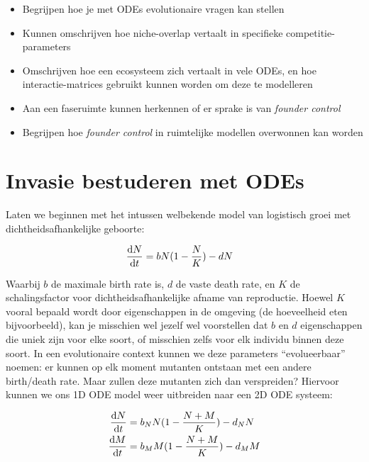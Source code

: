\documentclass[
  a4paper,
]{scrbook}
\providecommand{\tightlist}{%
  \setlength{\itemsep}{0pt}\setlength{\parskip}{0pt}}\usepackage{longtable,booktabs,array}
\theoremstyle{definition}
\theoremstyle{remark}
\begin{document}
\begin{itemize}
\tightlist
\item
  Begrijpen hoe je met ODEs evolutionaire vragen kan stellen
\item
  Kunnen omschrijven hoe niche-overlap vertaalt in specifieke
  competitie-parameters
\item
  Omschrijven hoe een ecosysteem zich vertaalt in vele ODEs, en hoe
  interactie-matrices gebruikt kunnen worden om deze te modelleren
\item
  Aan een faseruimte kunnen herkennen of er sprake is van \emph{founder
  control}
\item
  Begrijpen hoe \emph{founder control} in ruimtelijke modellen
  overwonnen kan worden
\end{itemize}

\hypertarget{invasie-bestuderen-met-odes}{%
\section{Invasie bestuderen met
ODEs}\label{invasie-bestuderen-met-odes}}

Laten we beginnen met het intussen welbekende model van logistisch groei
met dichtheidsafhankelijke geboorte:

\begin{align*}
\mathchoice{\frac{\mathrm{d}N}
{\mathrm{d}t}}{\mathrm{d}N/\mathrm{d}t}
{\mathrm{d}N/\mathrm{d}t}
{\mathrm{d}N/\mathrm{d}t} &= bN(1-\frac{N}{K}) - dN
\end{align*}

Waarbij \(b\) de maximale birth rate is, \(d\) de vaste death rate, en
\(K\) de schalingsfactor voor dichtheidsafhankelijke afname van
reproductie. Hoewel \(K\) vooral bepaald wordt door eigenschappen in de
omgeving (de hoeveelheid eten bijvoorbeeld), kan je misschien wel jezelf
wel voorstellen dat \(b\) en \(d\) eigenschappen die uniek zijn voor
elke soort, of misschien zelfs voor elk individu binnen deze soort. In
een evolutionaire context kunnen we deze parameters ``evolueerbaar''
noemen: er kunnen op elk moment mutanten ontstaan met een andere
birth/death rate. Maar zullen deze mutanten zich dan verspreiden?
Hiervoor kunnen we ons 1D ODE model weer uitbreiden naar een 2D ODE
systeem:

\begin{align*}
\mathchoice{\frac{\mathrm{d}N}
{\mathrm{d}t}}{\mathrm{d}N/\mathrm{d}t}
{\mathrm{d}N/\mathrm{d}t}
{\mathrm{d}N/\mathrm{d}t} &= b_NN(1-\frac{N+M}{K}) - d_NN\\
\mathchoice{\frac{\mathrm{d}M}
{\mathrm{d}t}}{\mathrm{d}M/\mathrm{d}t}
{\mathrm{d}M/\mathrm{d}t}
{\mathrm{d}M/\mathrm{d}t} &= b_MM(1-\frac{N+M}{K}) - d_MM
\end{align*}
\end{document}
